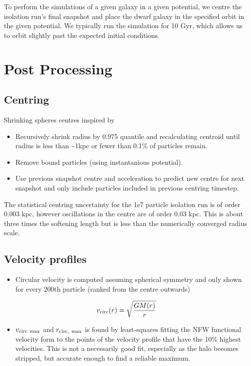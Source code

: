 To perform the simulations of a given galaxy in a given potential, we
centre the isolation run's final snapshot and place the dwarf galaxy in
the specified orbit in the given potential. We typically run the
simulation for 10 Gyr, which allows us to orbit slightly past the
expected initial conditions.

\section{Post Processing}\label{post-processing}

\subsection{Centring}\label{centring}

Shrinking spheres centres inspired by \citet{power+2003}

\begin{itemize}
\tightlist
\item
  Recursively shrink radius by 0.975 quantile and recalculating centroid
  until radius is less than \textasciitilde1kpc or fewer than 0.1\% of
  particles remain.
\item
  Remove bound particles (using instantanious potential).
\item
  Use previous snapshot centre and acceleration to predict new centre
  for next snapshot and only include particles included in previous
  centring timestep.
\end{itemize}

The statistical centring uncertainty for the 1e7 particle isolation run
is of order 0.003 kpc, however oscillations in the centre are of order
0.03 kpc. This is about three times the softening length but is less
than the numerically converged radius scale.

\subsection{Velocity profiles}\label{velocity-profiles}

\begin{itemize}
\tightlist
\item
  Circular velocity is computed assuming spherical symmetry and only
  shown for every 200th particle (ranked from the centre outwards)
\end{itemize}

\[
v_{\rm circ}(r) = \sqrt{\frac{GM(r)}{r}}
\]

\begin{itemize}
\tightlist
\item
  \(v_{\rm circ\ max}\) and \(r_{\rm circ,\ max}\) is found by
  least-squares fitting the NFW functional velocity form to the points
  of the velocity profile that have the 10\% highest velocities. This is
  not a necessarily good fit, especially as the halo becomes stripped,
  but accurate enough to find a reliable maximum.
\end{itemize}

